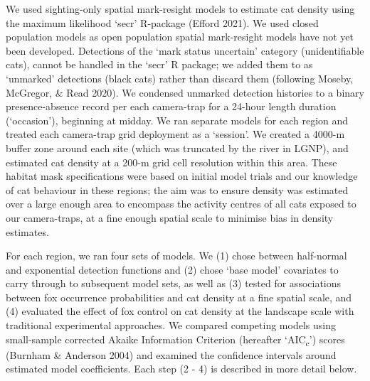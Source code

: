 \documentclass[11pt,a4paper,titlepage,twoside,openright]{style/unimelbthesis}
\begin{document}
\begin{mainmatter}
We used sighting-only spatial mark-resight models to estimate cat density using the maximum likelihood `secr' R-package (Efford 2021). We used closed population models as open population spatial mark-resight models have not yet been developed. Detections of the `mark status uncertain' category (unidentifiable cats), cannot be handled in the `secr' R package; we added them to as `unmarked' detections (black cats) rather than discard them (following Moseby, McGregor, \& Read 2020). We condensed unmarked detection histories to a binary presence-absence record per each camera-trap for a 24-hour length duration (`occasion'), beginning at midday. We ran separate models for each region and treated each camera-trap grid deployment as a `session'. We created a 4000-m buffer zone around each site (which was truncated by the river in LGNP), and estimated cat density at a 200-m grid cell resolution within this area. These habitat mask specifications were based on initial model trials and our knowledge of cat behaviour in these regions; the aim was to ensure density was estimated over a large enough area to encompass the activity centres of all cats exposed to our camera-traps, at a fine enough spatial scale to minimise bias in density estimates.

For each region, we ran four sets of models. We (1) chose between half-normal and exponential detection functions and (2) chose `base model' covariates to carry through to subsequent model sets, as well as (3) tested for associations between fox occurrence probabilities and cat density at a fine spatial scale, and (4) evaluated the effect of fox control on cat density at the landscape scale with traditional experimental approaches. We compared competing models using small-sample corrected Akaike Information Criterion (hereafter `AIC\textsubscript{c}') scores (Burnham \& Anderson 2004) and examined the confidence intervals around estimated model coefficients. Each step (2 - 4) is described in more detail below.


\end{mainmatter}
\end{document}
